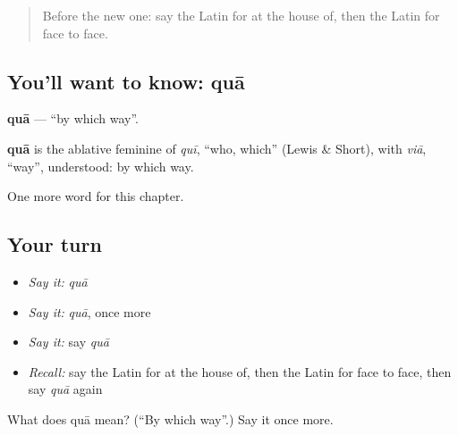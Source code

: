 \label{lesson:LA-C238-qua}



\begin{quote}
Before the new one: say the Latin for at the house of, then the Latin for face to face.
\end{quote}

\subsection*{You'll want to know: quā}
\textbf{quā} — \textquotedblleft{}by which way\textquotedblright{}.

\begin{cousinweb}
\textbf{quā} is the ablative feminine of \emph{quī}, \textquotedblleft{}who, which\textquotedblright{} (Lewis \& Short), with \emph{viā}, \textquotedblleft{}way\textquotedblright{}, understood: by which way.
\end{cousinweb}

\begin{grammarlens}[title={What you've built}]
One more word for this chapter.
\end{grammarlens}

\subsection*{Your turn}
\begin{itemize}
\raggedright
  \item \emph{Say it:} \emph{quā}
  \item \emph{Say it:} \emph{quā}, once more
  \item \emph{Say it:} say \emph{quā}
  \item \emph{Recall:} say the Latin for at the house of, then the Latin for face to face, then say \emph{quā} again
\end{itemize}

\begin{tcolorbox}[breakable,colback=teal!4,colframe=teal!35!black,title={Before you move on}]
What does quā mean? (\textquotedblleft{}By which way\textquotedblright{}.) Say it once more.
\end{tcolorbox}
